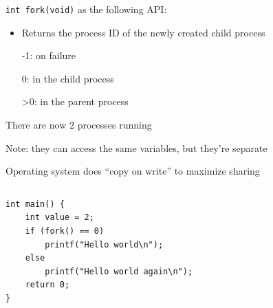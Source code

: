 \begin{slide}


    \texttt{int fork(void)} as the following API:
    \begin{itemize}
      \item Returns the process ID of the newly created child process

            \leftspace{}-1: on failure

            \leftspace{}0: in the child process

            \leftspace{}>0: in the parent process
    \end{itemize}
    \medskip

    There are now 2 processes running

    \leftspace{}Note: they can access the same variables, but they're separate

    \leftspace{}\leftspace{}Operating system does ``copy on write'' to maximize sharing
\end{slide}
  
\begin{slide}

    
    \inputminted{c}{fork_example_1.c}
    
\end{slide}

\begin{slide}

    
\begin{verbatim}
int main() {
    int value = 2;
    if (fork() == 0)
        printf("Hello world\n");
    else
        printf("Hello world again\n");
    return 0;
}
\end{verbatim}

\end{slide}

\begin{slide}

    
    \inputminted{c}{fork_example_2.c}
    
\end{slide}

